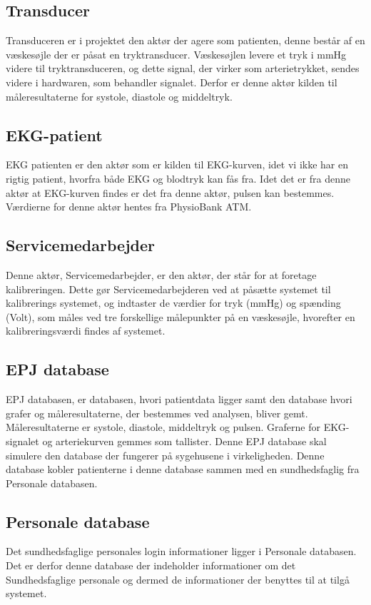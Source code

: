 \subsection{Transducer}
Transduceren er i projektet den aktør der agere som patienten, denne består af en væskesøjle der er påsat en tryktransducer. Væskesøjlen levere et tryk i mmHg videre til tryktransduceren, og dette signal, der virker som arterietrykket, sendes videre i hardwaren, som behandler signalet. Derfor er denne aktør kilden til måleresultaterne for systole, diastole og middeltryk. 
\subsection{EKG-patient}
EKG patienten er den aktør som er kilden til EKG-kurven, idet vi ikke har en rigtig patient, hvorfra både EKG og blodtryk kan fås fra. Idet det er fra denne aktør at EKG-kurven findes er det fra denne aktør, pulsen kan bestemmes.\\
Værdierne for denne aktør hentes fra PhysioBank ATM.
\subsection{Servicemedarbejder}
Denne aktør, Servicemedarbejder, er den aktør, der står for at foretage kalibreringen. Dette gør Servicemedarbejderen ved at påsætte systemet til kalibrerings systemet, og indtaster de værdier for tryk (mmHg) og spænding (Volt), som måles ved tre forskellige målepunkter på en væskesøjle, hvorefter en kalibreringsværdi findes af systemet.
\subsection{EPJ database}
EPJ databasen, er databasen, hvori patientdata ligger samt den database hvori grafer og måleresultaterne, der bestemmes ved analysen, bliver gemt. Måleresultaterne er systole, diastole, middeltryk og pulsen.
Graferne for EKG-signalet og arteriekurven gemmes som tallister. Denne EPJ database skal simulere den database der fungerer på sygehusene i virkeligheden. Denne database kobler patienterne i denne database sammen med en sundhedsfaglig fra Personale databasen.
\subsection{Personale database}
Det sundhedsfaglige personales login informationer ligger i Personale databasen. Det er derfor denne database der indeholder informationer om det Sundhedsfaglige personale og dermed de informationer der benyttes til at tilgå systemet.
